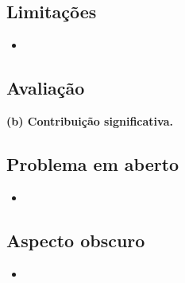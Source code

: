 \subsection{Limitações} %
\begin{itemize}
  \item 
\end{itemize} 


\subsection{Avaliação}
 \textbf{(b) Contribuição significativa.}

\subsection{Problema em aberto}
 \begin{itemize}
   \item 
 \end{itemize}  

\subsection{Aspecto obscuro}
 \begin{itemize}
   \item
 \end{itemize}  